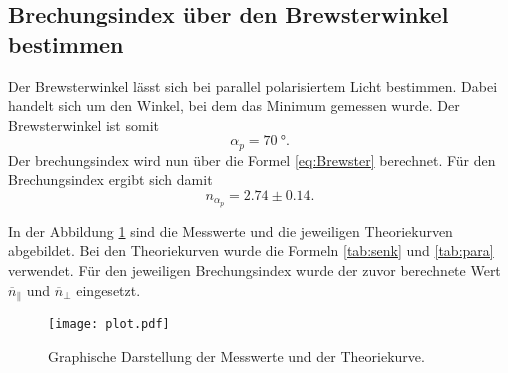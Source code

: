 \subsection{Brechungsindex über den Brewsterwinkel bestimmen}

Der Brewsterwinkel lässt sich bei parallel polarisiertem Licht bestimmen.
Dabei handelt sich um den Winkel, bei dem das Minimum gemessen wurde.
Der Brewsterwinkel ist somit
\begin{equation*}
  \alpha_p = \qty{70}{°}.
\end{equation*}    
Der brechungsindex wird nun über die Formel \ref{eq:Brewster} berechnet.
Für den Brechungsindex ergibt sich damit 
\begin{equation*}
  n_{\alpha_p} = 2.74 \pm 0.14.
\end{equation*}

\noindent In der Abbildung \ref{fig:plot} sind die Messwerte und die jeweiligen Theoriekurven abgebildet.
Bei den Theoriekurven wurde die Formeln \ref{tab:senk} und \ref{tab:para} verwendet.
Für den jeweiligen Brechungsindex wurde der zuvor berechnete Wert $\overline{n}_\parallel$ und $\overline{n}_\perp$ eingesetzt.

\begin{figure}
  \centering
  \texttt{[image: plot.pdf]}
  \caption{Graphische Darstellung der Messwerte und der Theoriekurve.}
  \label{fig:plot}
\end{figure}

